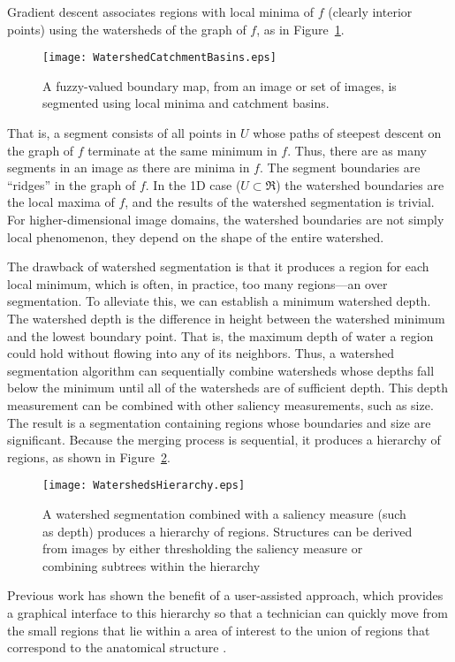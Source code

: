Gradient descent associates regions with local minima of $f$ (clearly interior
points) using the watersheds of the graph of $f$, as in
Figure~\ref{fig:segment}.
\begin{figure}
\centering
\texttt{[image: WatershedCatchmentBasins.eps]}
\caption{A fuzzy-valued boundary map, from an image or set of images, 
is segmented using local minima and catchment basins.}
\protect\label{fig:segment}
\end{figure}
That is, a segment consists of all points in $U$ whose paths of steepest
descent on the graph of $f$ terminate at the same minimum in $f$.  Thus, there
are as many segments in an image as there are minima in $f$.  The segment
boundaries are ``ridges'' \cite{Koenderink1979,Koenderink1993,Eberly1996} in
the graph of $f$.  In the 1D case ($U \subset \Re$) the watershed boundaries
are the local maxima of $f$, and the results of the watershed segmentation is
trivial.  For higher-dimensional image domains, the watershed boundaries are
not simply local phenomenon, they depend on the shape of the entire watershed.

The drawback of watershed segmentation is that it produces a region for each
local minimum, which is often, in practice, too many regions---an over
segmentation.  To alleviate this, we can establish a minimum watershed depth.
The watershed depth is the difference in height between the watershed minimum
and the lowest boundary point.  That is, the maximum depth of water a region
could hold without flowing into any of its neighbors.  Thus, a watershed
segmentation algorithm can sequentially combine watersheds whose depths fall
below the minimum until all of the watersheds are of sufficient depth.  This
depth measurement can be combined with other saliency measurements, such as
size.  The result is a segmentation containing regions whose boundaries and
size are significant.  Because the merging process is sequential, it produces a
hierarchy of regions, as shown in Figure~\ref{fig:watersheds}.
\begin{figure}
\centering
\texttt{[image: WatershedsHierarchy.eps]}
\caption{A watershed segmentation combined with a saliency measure 
(such as depth) produces a hierarchy of regions.  Structures can be 
derived from images by either thresholding the saliency measure or 
combining subtrees within the hierarchy}
\protect\label{fig:watersheds}
\end{figure}
Previous work has shown the benefit of a user-assisted approach, which provides
a graphical interface to this hierarchy so that a technician can quickly move
from the small regions that lie within a area of interest to the union of
regions that correspond to the anatomical structure \cite{Yoo1991}.

